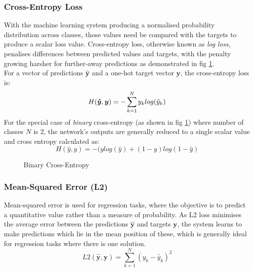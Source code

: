 \documentclass{report}
\begin{document}
\subsubsection{Cross-Entropy Loss} \label{crossentropy}
With the machine learning system producing a normalised probability distribution across classes, those values need be compared with the targets to produce a scalar loss value.
Cross-entropy loss, otherwise known as \textit{log loss}, penalises differences between predicted values and targets, with the penalty growing harsher for further-away predictions as demonstrated in fig \ref{fig:cross-entropy:1}.\\
For a vector of predictions $\bm{\hat{y}}$ and a one-hot target vector $\bm{y}$, the cross-entropy loss is:
\begin{equation} \label{cross-entropy:1}
 H(\bm{\hat{y}}, \bm{y}) = - \sum_{k=1}^{N}y_k log(\hat{y}_k) \\
\end{equation}
For the special case of \textit{binary} cross-entropy (as shown in fig \ref{fig:cross-entropy:1}) where number of classes $N$ is 2, the network's outputs are generally reduced to a single scalar value and cross entropy calculated as:
\begin{equation} \label{cross-entropy:2}
 H(\hat{y}, y) = -(y log(\hat{y}) + (1 - y)log(1-\hat{y})
\end{equation}
\begin{figure}[!h]
 \centering
 \caption{Binary Cross-Entropy}
 \label{fig:cross-entropy:1}
\end{figure}

\subsubsection{Mean-Squared Error (L2)}
Mean-squared error is used for regression tasks, where the objective is to predict a quantitative value rather than a measure of probability. As L2 loss minimises the average error between the predictions $\bm{\hat{y}}$ and targets $\bm{y}$, the system learns to make predictions which lie in the mean position of these, which is generally ideal for regression tasks where there is one solution.\\
\begin{equation} \label{mean-squared-error:1}
 L2(\hat{\bm{y}}, \bm{y}) = \sum_{k=1}^{N}(y_k - \hat{y}_k)^2
\end{equation}
\end{document}
